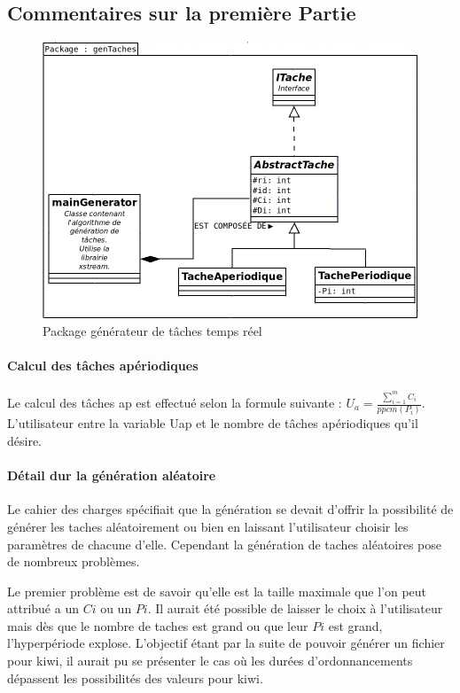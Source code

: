 \subsection{Commentaires sur la première Partie}
   \begin{figure}[htbp]
  \centering
  \includegraphics[scale=0.60]{img/packgen}
  \caption{Package générateur de tâches temps réel}
  \label{fig:gen}
\end{figure}

\paragraph{Calcul des tâches apériodiques} 
Le calcul des tâches ap est effectué selon la formule suivante : $ U_a =  \frac{\sum_{i=1}^m C_i}{ppcm(P_i)}$. L'utilisateur entre la variable Uap  et le nombre de tâches apériodiques qu'il désire. 
\paragraph{Détail dur la génération aléatoire}
Le cahier des charges spécifiait que la génération se devait d'offrir la possibilité de générer les taches aléatoirement ou bien en laissant l'utilisateur choisir les paramètres de chacune d'elle. Cependant la génération de taches aléatoires pose de nombreux problèmes.

Le premier problème est de savoir qu'elle est la taille maximale que l'on peut attribué a un $Ci$ ou un $Pi$. Il aurait été possible de laisser le choix à l'utilisateur mais dès que le nombre de taches est grand ou que leur $Pi$ est grand, l'hyperpériode explose. L'objectif étant par la suite de pouvoir générer un fichier pour kiwi, il aurait pu se présenter le cas où les durées d'ordonnancements dépassent les possibilités des valeurs pour kiwi.

